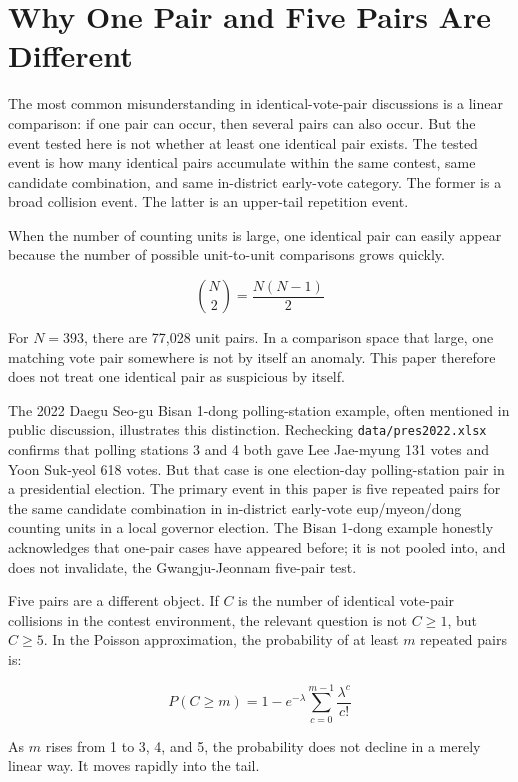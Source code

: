 \documentclass[preprint]{IEIE}
\begin{document}
\section{Why One Pair and Five Pairs Are Different}

The most common misunderstanding in identical-vote-pair discussions is a linear comparison: if one pair can occur, then several pairs can also occur. But the event tested here is not whether at least one identical pair exists. The tested event is how many identical pairs accumulate within the same contest, same candidate combination, and same in-district early-vote category. The former is a broad collision event. The latter is an upper-tail repetition event.

When the number of counting units is large, one identical pair can easily appear because the number of possible unit-to-unit comparisons grows quickly.

\[
\binom{N}{2} = \frac{N(N-1)}{2}
\]

For \(N=393\), there are 77,028 unit pairs. In a comparison space that large, one matching vote pair somewhere is not by itself an anomaly. This paper therefore does not treat one identical pair as suspicious by itself.

The 2022 Daegu Seo-gu Bisan 1-dong polling-station example, often mentioned in public discussion, illustrates this distinction. Rechecking \texttt{data/pres2022.xlsx} confirms that polling stations 3 and 4 both gave Lee Jae-myung 131 votes and Yoon Suk-yeol 618 votes. But that case is one election-day polling-station pair in a presidential election. The primary event in this paper is five repeated pairs for the same candidate combination in in-district early-vote eup/myeon/dong counting units in a local governor election. The Bisan 1-dong example honestly acknowledges that one-pair cases have appeared before; it is not pooled into, and does not invalidate, the Gwangju-Jeonnam five-pair test.

Five pairs are a different object. If \(C\) is the number of identical vote-pair collisions in the contest environment, the relevant question is not \(C \ge 1\), but \(C \ge 5\). In the Poisson approximation, the probability of at least \(m\) repeated pairs is:

\[
P(C \ge m) = 1 - e^{-\lambda}\sum_{c=0}^{m-1}\frac{\lambda^c}{c!}
\]

As \(m\) rises from 1 to 3, 4, and 5, the probability does not decline in a merely linear way. It moves rapidly into the tail.
\end{document}
